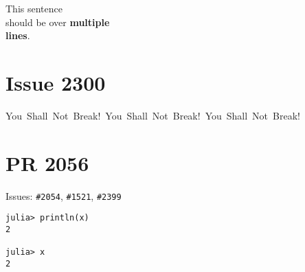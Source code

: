 \label{18112929726868774212}{}


This sentence\\
should be over \textbf{multiple\\
lines}.



\section{Issue 2300}



\label{5494601647308340695}{}


You~Shall~Not~Break!~You~Shall~Not~Break!~You~Shall~Not~Break!



\section{PR 2056}



\label{1659457410429464311}{}


Issues: \texttt{\#2054}, \texttt{\#1521}, \texttt{\#2399}




\begin{verbatim}
julia> println(x)
2

julia> x
2
\end{verbatim}




